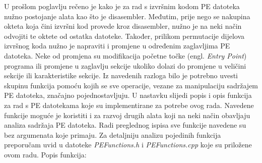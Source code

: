 \documentclass[times, utf8, diplomski, numeric]{fer}
\begin{document}
U prošlom poglavlju rečeno je kako je za rad s izvršnim kodom PE
datoteka nužno postojanje alata kao što je disasembler. Međutim,
prije nego se nakupina okteta koja čini izvršni kod provede kroz
disasembler, nužno je na neki način odvojiti te oktete od ostatka
datoteke. Također, prilikom permutacije dijelova izvršnog koda
nužno je napraviti i promjene u određenim zaglavljima PE
datoteka. Neke od promjena su modifikacija početne točke (engl.
\emph{Entry Point}) programa ili promjene u zaglavlju sekcije
ukoliko dolazi do promjene u veličini sekcije ili karakteristike
sekcije. Iz navedenih razloga bilo je potrebno uvesti skupinu
funkcija pomoću kojih se sve operacije, vezane za manipulaciju
sadržajem PE datoteka, značajno pojednostavljuju. U nastavku
slijedi popis i opis funkcija za rad s PE datotekama koje su
implementirane za potrebe ovog rada. Navedene funkcije moguće je
koristiti i za razvoj drugih alata koji na neki način obavljaju
analiza sadržaja PE datoteka. Radi preglednog ispisa sve funkcije
navedene su bez argumenata koje primaju. Za detaljniju analizu
pojedinih funkcija preporučam uvid u datoteke
\emph{PEFunctions.h} i \emph{PEFunctions.cpp} koje su priložene
ovom radu. Popis funkcija:
\end{document}

